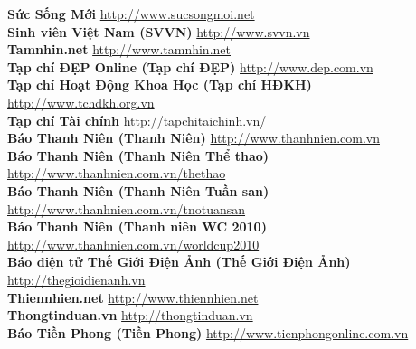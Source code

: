 \textbf{Sức Sống Mới}  \hspace{0.5in} \href{http://www.sucsongmoi.net}{http://www.sucsongmoi.net} \\ 
\textbf{Sinh viên Việt Nam (SVVN)}  \hspace{0.5in} \href{http://www.svvn.vn}{http://www.svvn.vn} \\ 
\textbf{Tamnhin.net}  \hspace{0.5in} \href{http://www.tamnhin.net}{http://www.tamnhin.net} \\ 
\textbf{Tạp chí ĐẸP Online (Tạp chí ĐẸP)}  \hspace{0.5in} \href{http://www.dep.com.vn}{http://www.dep.com.vn} \\ 
\textbf{Tạp chí Hoạt Động Khoa Học (Tạp chí HĐKH)}  \hspace{0.5in} \href{http://www.tchdkh.org.vn}{http://www.tchdkh.org.vn} \\ 
\textbf{Tạp chí Tài chính}  \hspace{0.5in} \href{http://tapchitaichinh.vn/}{http://tapchitaichinh.vn/} \\ 
\textbf{Báo Thanh Niên (Thanh Niên)}  \hspace{0.5in} \href{http://www.thanhnien.com.vn}{http://www.thanhnien.com.vn} \\ 
\textbf{Báo Thanh Niên (Thanh Niên Thể thao)} \hspace{0.5in} \href{http://www.thanhnien.com.vn/thethao}{http://www.thanhnien.com.vn/thethao} \\ 
\textbf{Báo Thanh Niên (Thanh Niên Tuần san)} \hspace{0.5in} \href{http://www.thanhnien.com.vn/tnotuansan}{http://www.thanhnien.com.vn/tnotuansan} \\ 
\textbf{Báo Thanh Niên (Thanh niên WC 2010)} \hspace{0.5in} \href{http://www.thanhnien.com.vn/worldcup2010}{http://www.thanhnien.com.vn/worldcup2010} \\ 
\textbf{Báo điện tử Thế Giới Điện Ảnh (Thế Giới Điện Ảnh)}  \hspace{0.5in} \href{http://thegioidienanh.vn}{http://thegioidienanh.vn} \\ 
\textbf{Thiennhien.net}  \hspace{0.5in} \href{http://www.thiennhien.net}{http://www.thiennhien.net} \\ 
\textbf{Thongtinduan.vn}  \hspace{0.5in} \href{http://thongtinduan.vn}{http://thongtinduan.vn} \\ 
\textbf{Báo Tiền Phong (Tiền Phong)}  \hspace{0.5in} \href{http://www.tienphongonline.com.vn}{http://www.tienphongonline.com.vn} \\ 
